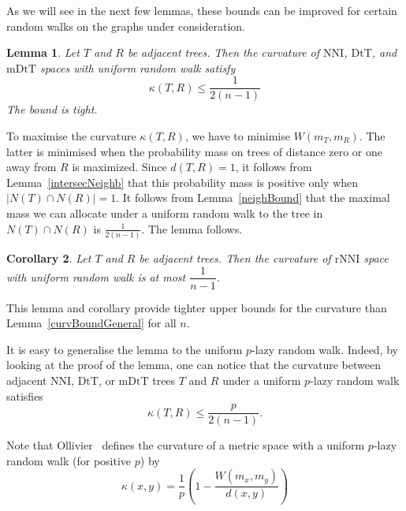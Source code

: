 \documentclass{amsart}
\newtheorem{lemma}{Lemma}
\newtheorem{corollary}[lemma]{Corollary}
\newcommand{\dts}{\mathrm{DtT}}
\newcommand{\nni}{\mathrm{NNI}}
\newcommand{\rnni}{\mathrm{rNNI}}
\newcommand{\mdts}{\mathrm{mDtT}}
\begin{document}
As we will see in the next few lemmas, these bounds can be improved for certain random walks on the graphs under consideration.

\begin{lemma}\label{uniformUpper}
Let $T$ and $R$ be adjacent trees.
Then the curvature of $\nni$, $\dts$, and $\mdts$ spaces with uniform random walk satisfy
\[
\kappa(T,R) \leq \dfrac{1}{2(n-1)}
\]
The bound is tight.
\end{lemma}

\proof
To maximise the curvature $\kappa(T,R)$, we have to minimise $W(m_T,m_R)$.
The latter is minimised when the probability mass on trees of distance zero or one away from $R$ is maximized.
Since $d(T,R) = 1$, it follows from
Lemma~\ref{intersecNeighb} that this probability mass is positive only
when $|N(T) \cap N(R)| = 1$. It follows from Lemma~\ref{neighBound} that
the maximal mass we can allocate under a uniform random walk to the tree in
$N(T) \cap N(R)$ is $\frac{1}{2(n-1)}$. The lemma follows.
\endproof

\begin{corollary}
Let $T$ and $R$ be adjacent trees.
Then the curvature of $\rnni$ space with uniform random walk is at most $\dfrac{1}{n-1}$.
\end{corollary}

This lemma and corollary provide tighter upper bounds for the curvature than Lemma~\ref{curvBoundGeneral} for all $n$.

It is easy to generalise the lemma to the uniform $p$-lazy random walk.
Indeed, by looking at the proof of the lemma, one can notice that the curvature between adjacent $\nni$, $\dts$, or $\mdts$ trees $T$ and $R$ under a uniform $p$-lazy random walk satisfies
\[
\kappa(T,R) \leq \frac{p}{2(n-1)}.
\]

Note that Ollivier~\cite{Ollivier2009-cj} defines the curvature of a metric
space with a uniform $p$-lazy random walk (for positive $p$) by
\[
\kappa(x,y) = \frac1p \left(1 - \frac{W(m_x, m_y)}{d(x, y)}\right)
\]
\end{document}
